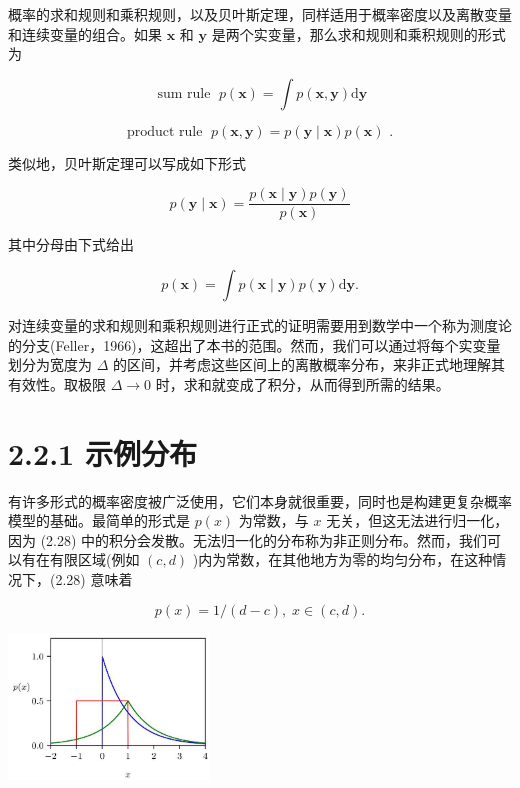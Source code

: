 \documentclass[10pt]{report}
\begin{document}
概率的求和规则和乘积规则，以及贝叶斯定理，同样适用于概率密度以及离散变量和连续变量的组合。如果 \(\mathbf{x}\) 和 \(\mathbf{y}\) 是两个实变量，那么求和规则和乘积规则的形式为

\[
\text{ sum rule }\;p\left( \mathbf{x}\right)  = \int p\left( {\mathbf{x},\mathbf{y}}\right) \mathrm{d}\mathbf{y} \tag{2.29}
\]

\[
\text{ product rule }\;p\left( {\mathbf{x},\mathbf{y}}\right)  = p\left( {\mathbf{y} \mid  \mathbf{x}}\right) p\left( \mathbf{x}\right) \text{ . } \tag{2.30}
\]

类似地，贝叶斯定理可以写成如下形式

\[
p\left( {\mathbf{y} \mid  \mathbf{x}}\right)  = \frac{p\left( {\mathbf{x} \mid  \mathbf{y}}\right) p\left( \mathbf{y}\right) }{p\left( \mathbf{x}\right) } \tag{2.31}
\]

其中分母由下式给出

\[
p\left( \mathbf{x}\right)  = \int p\left( {\mathbf{x} \mid  \mathbf{y}}\right) p\left( \mathbf{y}\right) \mathrm{d}\mathbf{y}. \tag{2.32}
\]

对连续变量的求和规则和乘积规则进行正式的证明需要用到数学中一个称为测度论的分支(Feller，1966)，这超出了本书的范围。然而，我们可以通过将每个实变量划分为宽度为 \(\Delta\) 的区间，并考虑这些区间上的离散概率分布，来非正式地理解其有效性。取极限 \(\Delta  \rightarrow  0\) 时，求和就变成了积分，从而得到所需的结果。

\section*{2.2.1 示例分布}

有许多形式的概率密度被广泛使用，它们本身就很重要，同时也是构建更复杂概率模型的基础。最简单的形式是 \(p\left( x\right)\) 为常数，与 \(x\) 无关，但这无法进行归一化，因为 (2.28) 中的积分会发散。无法归一化的分布称为非正则分布。然而，我们可以有在有限区域(例如 \(\left( {c,d}\right)\) )内为常数，在其他地方为零的均匀分布，在这种情况下，(2.28) 意味着

\[
p\left( x\right)  = 1/\left( {d - c}\right) ,\;x \in  \left( {c,d}\right) . \tag{2.33}
\]

\begin{center}
\includegraphics[max width=0.4\textwidth]{images/0194e279-9b28-703a-88f4-c3ac21e2010d_53_944_343_607_443_0.jpg}
\end{center}
\hspace*{3em} 
\end{document}
